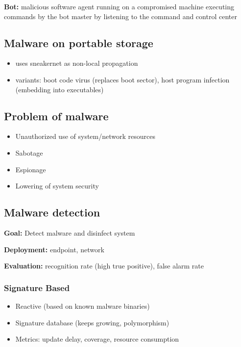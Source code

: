 \documentclass[fs, footer]{latex4ei}
\begin{document}
\begin{multicols*}{4}
\textbf{Bot:} malicious software agent running on a compromised machine executing commands by the bot master by listening to the command and control center


\subsection{Malware on portable storage}

\begin{itemize}
 	\item uses sneakernet as non-local propagation
 	\item variants: boot code virus (replaces boot sector), host program infection (embedding into executables)
 \end{itemize} 

 \subsection{Problem of malware}

 \begin{itemize}
  	\item Unauthorized use of system/network resources
  	\item Sabotage
  	\item Espionage
  	\item Lowering of system security
  \end{itemize} 


  \subsection{Malware detection}

  \textbf{Goal:} Detect malware and disinfect system 

  \textbf{Deployment:} endpoint, network

  \textbf{Evaluation:} recognition rate (high true positive), false alarm rate 


  \subsubsection{Signature Based}
  \begin{itemize}
   	\item Reactive (based on known malware binaries)
   	\item Signature database (keeps growing, polymorphism)
   	\item Metrics: update delay, coverage, resource consumption
   \end{itemize} 


\end{multicols*}
\end{document}
